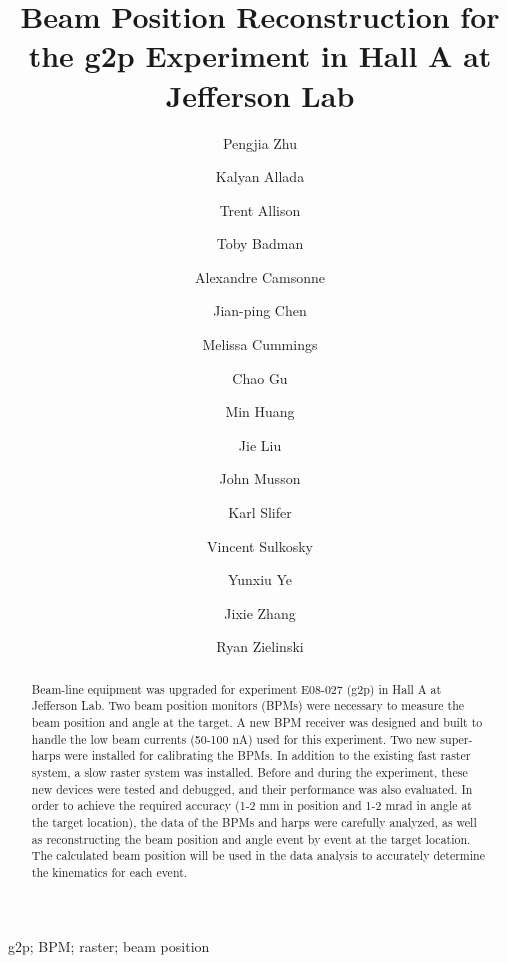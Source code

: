 \documentclass[english,review,number,sort&compress]{elsarticle}
\begin{document}
\begin{frontmatter}{}


\title{Beam Position Reconstruction for the g2p Experiment in Hall A at Jefferson Lab}


\author[USTC]{Pengjia Zhu}


\author[JLAB,MIT]{Kalyan Allada}
\author[JLAB]{Trent Allison}
\author[UNH]{Toby Badman}
\author[JLAB]{Alexandre Camsonne}
\author[JLAB]{Jian-ping Chen}
\author[WM]{Melissa Cummings}
\author[UVA]{Chao Gu}
\author[DUKE]{Min Huang}
\author[UVA]{Jie Liu}
\author[JLAB]{John Musson}
\author[UNH]{Karl Slifer}
\author[UVA,MIT]{Vincent Sulkosky}
\author[USTC]{Yunxiu Ye}
\author[JLAB,UVA]{Jixie Zhang}
\author[UNH]{Ryan Zielinski}

\address[USTC]{University of Science and Technology of China,Hefei,Anhui 230026,China}
\address[JLAB]{Thomas Jefferson National Accelerator Facility,Newport News,VA 23606,USA}
\address[UNH]{University of New Hampshire,Durham,NH 03824,USA}
\address[WM]{College of William \& Mary,Williamsburg,VA 23187,USA}
\address[UVA]{University of Virginia,Charlottesville,VA 22904,USA}
\address[DUKE]{Duke University,Durham,NC 27708,USA}
\address[MIT]{Massachusetts Institute of Technology,MA,02139,USA}
\begin{abstract}
Beam-line equipment was upgraded for experiment E08-027 (g2p) in Hall A at Jefferson Lab. Two beam position monitors (BPMs) were necessary to measure the beam position and angle at the target. A new BPM receiver was designed and built to handle the low beam currents (50-100 nA) used for this experiment. Two new super-harps were installed for calibrating the BPMs. In addition to the existing fast raster system, a slow raster system was installed. Before and during the experiment, these new devices were tested and debugged, and their performance was also evaluated. In order to achieve the required accuracy (1-2 mm in position and 1-2 mrad in angle at the target location), the data of the BPMs and harps were carefully analyzed, as well as reconstructing the beam position and angle event by event at the target location. The calculated beam position will be used in the data analysis to accurately determine the kinematics for each event.\end{abstract}
\begin{keyword}
g2p; BPM; raster; beam position 
\end{keyword}
\end{frontmatter}{}
\end{document}
